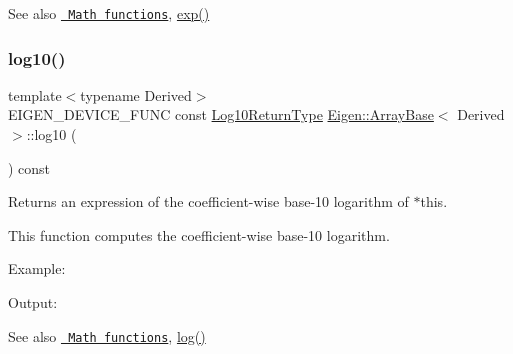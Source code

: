 \begin{DoxySeeAlso}{See also}
\href{group__CoeffwiseMathFunctions.html\#cwisetable_log}{\texttt{ Math functions}}, \mbox{\hyperlink{class_eigen_1_1_array_base_a7b262ecb3e4db0f87d2eae85f2d64f15}{exp()}} 
\end{DoxySeeAlso}
\mbox{\label{class_eigen_1_1_array_base_a3ea6653e344e9233ccba8648ffc6389a}} 
\subsubsection{\texorpdfstring{log10()}{log10()}}
{\footnotesize\ttfamily template$<$typename Derived$>$ \\
E\+I\+G\+E\+N\+\_\+\+D\+E\+V\+I\+C\+E\+\_\+\+F\+U\+NC const \mbox{\hyperlink{class_eigen_1_1_cwise_unary_op}{Log10\+Return\+Type}} \mbox{\hyperlink{class_eigen_1_1_array_base}{Eigen\+::\+Array\+Base}}$<$ Derived $>$\+::log10 (\begin{DoxyParamCaption}{ }\end{DoxyParamCaption}) const\hspace{0.3cm}{\ttfamily [inline]}}

\begin{DoxyReturn}{Returns}
an expression of the coefficient-\/wise base-\/10 logarithm of $\ast$this.
\end{DoxyReturn}
This function computes the coefficient-\/wise base-\/10 logarithm.

Example\+: 
\begin{DoxyCodeInclude}{0}
\end{DoxyCodeInclude}
 Output\+: 
\begin{DoxyVerbInclude}
\end{DoxyVerbInclude}


\begin{DoxySeeAlso}{See also}
\href{group__CoeffwiseMathFunctions.html\#cwisetable_log10}{\texttt{ Math functions}}, \mbox{\hyperlink{class_eigen_1_1_array_base_a7748ba1f6891fa4e10723a8bf77b8770}{log()}} 
\end{DoxySeeAlso}
\mbox{\label{class_eigen_1_1_array_base_a438640146f3e7488f09a4f60c305b1d9}} 
